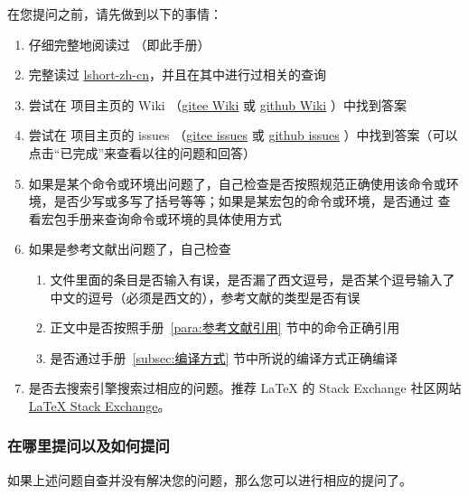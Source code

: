 在您提问之前，请先做到以下的事情：
\begin{enumerate}
  \item 仔细完整地阅读过  （即此手册）
  \item 完整读过 \href{https://ctan.math.illinois.edu/info/lshort/chinese/lshort-zh-cn.pdf}{lshort-zh-cn}，并且在其中进行过相关的查询
  \item 尝试在  项目主页的 Wiki （\href{https://gitee.com/xkwxdyy/CCNUthesis/wikis/Home}{gitee Wiki} 或 \href{https://github.com/xkwxdyy/CCNUthesis/wikis/Home}{github Wiki} ）中找到答案
  \item 尝试在  项目主页的 issues （\href{https://gitee.com/xkwxdyy/CCNUthesis/issues}{gitee issues} 或 \href{https://github.com/xkwxdyy/CCNUthesis/issues}{github issues} ）中找到答案（可以点击“已完成”来查看以往的问题和回答）
  \item 如果是某个命令或环境出问题了，自己检查是否按照规范正确使用该命令或环境，是否少写或多写了括号等等；如果是某宏包的命令或环境，是否通过   查看宏包手册来查询命令或环境的具体使用方式
  \item 如果是参考文献出问题了，自己检查
    \begin{enumerate}
      \item {} 文件里面的条目是否输入有误，是否漏了西文逗号，是否某个逗号输入了中文的逗号（必须是西文的），参考文献的类型是否有误
      \item 正文中是否按照手册~\ref{para:参考文献引用} 节中的命令正确引用
      \item 是否通过手册~\ref{subsec:编译方式} 节中所说的编译方式正确编译
    \end{enumerate}
  \item 是否去搜索引擎搜索过相应的问题。推荐 \LaTeX{} 的 Stack Exchange 社区网站 \href{https://tex.stackexchange.com/}{LaTeX Stack Exchange}。
\end{enumerate}


\subsubsection{在哪里提问以及如何提问}

如果上述问题自查并没有解决您的问题，那么您可以进行相应的提问了。

